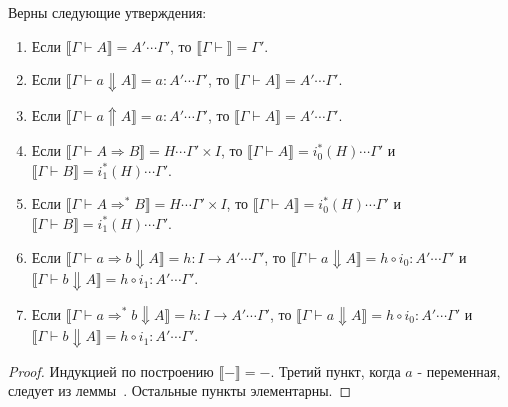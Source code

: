 \documentclass{amsart}
\theoremstyle{definition}
\theoremstyle{remark}
\newcommand{\red}{\Rightarrow}
\renewcommand{\ll}{\llbracket}
\newcommand{\rr}{\rrbracket}
\numberwithin{figure}{section}
\begin{document}
\begin{lem}
Верны следующие утверждения:
\begin{enumerate}
\item Если $\ll \Gamma \vdash A \rr = A' \dotsb \Gamma'$, то $\ll \Gamma \vdash \rr = \Gamma'$.
\item Если $\ll \Gamma \vdash a \Downarrow A \rr = a : A' \dotsb \Gamma'$, то $\ll \Gamma \vdash A \rr = A' \dotsb \Gamma'$.
\item Если $\ll \Gamma \vdash a \Uparrow A \rr = a : A' \dotsb \Gamma'$, то $\ll \Gamma \vdash A \rr = A' \dotsb \Gamma'$.
\item Если $\ll \Gamma \vdash A \red B \rr = H \dotsb \Gamma' \times I$, то $\ll \Gamma \vdash A \rr = i_0^*(H) \dotsb \Gamma'$ и $\ll \Gamma \vdash B \rr = i_1^*(H) \dotsb \Gamma'$.
\item Если $\ll \Gamma \vdash A \red^* B \rr = H \dotsb \Gamma' \times I$, то $\ll \Gamma \vdash A \rr = i_0^*(H) \dotsb \Gamma'$ и $\ll \Gamma \vdash B \rr = i_1^*(H) \dotsb \Gamma'$.
\item Если $\ll \Gamma \vdash a \red b \Downarrow A \rr = h : I \to A' \dotsb \Gamma'$, то $\ll \Gamma \vdash a \Downarrow A \rr = h \circ i_0 : A' \dotsb \Gamma'$ и $\ll \Gamma \vdash b \Downarrow A \rr = h \circ i_1 : A' \dotsb \Gamma'$.
\item Если $\ll \Gamma \vdash a \red^* b \Downarrow A \rr = h : I \to A' \dotsb \Gamma'$, то $\ll \Gamma \vdash a \Downarrow A \rr = h \circ i_0 : A' \dotsb \Gamma'$ и $\ll \Gamma \vdash b \Downarrow A \rr = h \circ i_1 : A' \dotsb \Gamma'$.
\end{enumerate}
\end{lem}
\begin{proof}
Индукцией по построению $\ll - \rr = -$.
Третий пункт, когда $a$ - переменная, следует из леммы~.
Остальные пункты элементарны.
\end{proof}
\end{document}
